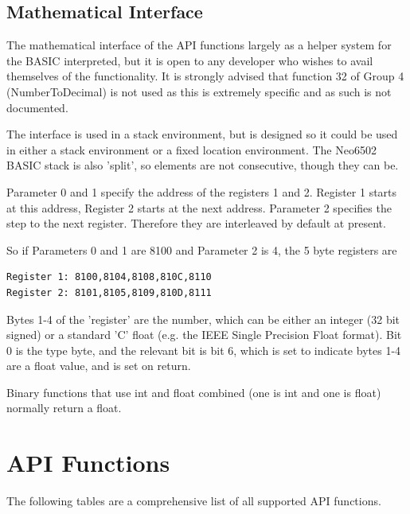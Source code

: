 \documentclass[12pt]{article}
\begin{document}
\pagebreak


\subsection{Mathematical Interface}\label{subsec:api-protocol-maths}

The mathematical interface of the API functions largely as a helper system for the BASIC interpreted, but it is
open to any developer who wishes to avail themselves of the functionality. It is strongly advised that function 32 
of Group 4 (NumberToDecimal) is not used as this is extremely specific and as such is not documented.
\newline

The interface is used in a stack environment, but is designed so it could be used in either a stack environment or a
fixed location environment. The Neo6502 BASIC stack is also 'split', so elements are not consecutive, though they
can be.
\newline

Parameter 0 and 1 specify the address of the registers 1 and 2. Register 1 starts at this address, Register 2 starts at the
next address. Parameter 2 specifies the step to the next register. Therefore they are interleaved by default at present.
\newline

So if Parameters 0 and 1 are 8100 and Parameter 2 is 4, the 5 byte registers are

\begin{verbatim}
Register 1: 8100,8104,8108,810C,8110
Register 2: 8101,8105,8109,810D,8111
\end{verbatim}

Bytes 1-4 of the 'register' are the number, which can be either an integer (32 bit signed) or a standard 'C' float (e.g. the
IEEE Single Precision Float format). Bit 0 is the type byte, and the relevant bit is bit 6, which is set to indicate bytes 1-4
are a float value, and is set on return.
\newline

Binary functions that use int and float combined (one is int and one is float) normally return a float.

\pagebreak


\section{API Functions}\label{api-functions}

The following tables are a comprehensive list of all supported API functions.
\newline
\end{document}
